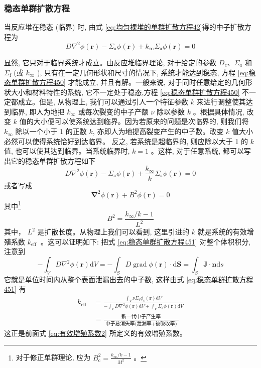\documentclass{Sichuan Normal University}
\begin{document}
\subsubsection*{稳态单群扩散方程}
当反应堆在稳态 (临界) 时, 由式 \eqref{eq:均匀裸堆的单群扩散方程42}得的中子扩散方程为
\begin{equation}
D \nabla^2 \phi(\boldsymbol{r})-\Sigma_{\mathrm{a}} \phi(\boldsymbol{r})+k_{\infty} \Sigma_{\mathrm{a}} \phi(\boldsymbol{r})=0
\label{eq:稳态单群扩散方程450}
\end{equation}

显然, 它只对于临界系统才成立。由反应堆临界理论, 对于给定的参数 $D_c 、 \Sigma_{a}$ 和 $\Sigma_{\mathrm{f}}$ (或 $k_{\infty}$ ), 只有在一定几何形状和尺寸的情况下, 系统才能达到稳态, 方程 \eqref{eq:稳态单群扩散方程450} 才能成立, 并且有解。一般来说, 对于同时任意给定的几何形状大小和材料特性的系统, 它不一定处于稳态,方程 \eqref{eq:稳态单群扩散方程450} 不一定都成立。但是, 从物理上, 我们可以通过引人一个特征参数 $k$ 来进行调整使其达到临界, 即人为地把 $k_{\infty}$ 或每次裂变的中子产额 $\nu$ 除以参数 $k$ 。根据具体情况, 改变 $k$ 值的大小便可以使系统达到临界。因为若原来的问题是次临界的, 则我们将 $k_{\infty}$ 除以一个小于 1 的正数 $k$, 亦即人为地提高裂变产生的中子数。改变 $k$ 值大小必然可以使得系统恰好到达临界。
反之, 若系统是超临界的, 则应除以大于 1 的 $k$ 值, 也可以使其达到临界。当系统临界时, $k=1$ 。这样, 对于任意系统, 都可以写出它的稳态单群扩散方程如下
\begin{equation}
D \nabla^2 \phi(\boldsymbol{r})-\Sigma_{\mathrm{a}} \phi(\boldsymbol{r})+\frac{k_{\infty}}{k} \Sigma_{\mathrm{a}} \phi(\boldsymbol{r})=0
\label{eq:稳态单群扩散方程451}
\end{equation}
或者写成
\begin{equation}
\boldsymbol{\nabla}^2 \phi(\boldsymbol{r})+B^2 \phi(\boldsymbol{r})=0
\end{equation}其中\footnote{对于修正单群理论, 应为 $B_{\mathrm{c}}^2=\frac{k_{\infty} / k-1}{M^2}$ 。}
\begin{equation}
B^2=\frac{k_{\infty} / k-1}{L^2}
\end{equation}
其中， $L^2$ 是扩散长度。从物理上我们可以看到, 这里引进的 $k$ 就是系统的有效增殖系数 $k_{\text {eff }}$ 。这可以证明如下: 把式 \eqref{eq:稳态单群扩散方程451} 对整个体积积分, 注意到
\begin{equation}
-\int_V D \nabla^2 \phi(\boldsymbol{r}) \mathrm{d} V=-\int_S D \operatorname{grad} \phi(\boldsymbol{r}) \cdot \mathrm{d} \boldsymbol{S}=\int_S \boldsymbol{J} \cdot \boldsymbol{n} \mathrm{d} s
\end{equation}
它就是单位时间内从整个表面泄漏出去的中子数, 这样由式 \eqref{eq:稳态单群扩散方程451} 有
\begin{equation}
\begin{aligned}
k_{\text {eff }} & =\frac{\int_V \nu \Sigma_i \phi_c(\boldsymbol{r}) \mathrm{d} V}{-\int_V D \nabla^2 \phi(\boldsymbol{r}) \mathrm{d} V+\int_V \Sigma_{\mathrm{a}} \phi(\boldsymbol{r}) \mathrm{d} V} \\
& =\frac{\text { 新一代中子产生率 }}{\text { 中子总消失率(泄漏率+被吸收率) }}
\end{aligned}
\end{equation}
这正是前面式 \eqref{eq:有效增殖系数2} 所定义的有效增殖系数。
\end{document}
